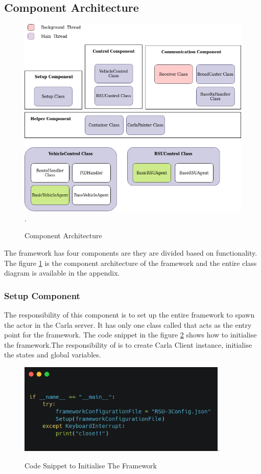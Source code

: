 \subsection{Component Architecture}

\begin{figure}[h!]
    \centering
    \includegraphics[width=12cm]{Framework/Images/FArc.png}.
    \caption{Component Architecture}
    \label{arrrk}
\end{figure}

The framework has four components are they are divided based on functionality. The figure \ref{arrrk} is the component architecture of the framework and the entire class diagram is available in the appendix.

\subsubsection{Setup Component}
The responsibility of this component is to set up the entire framework to spawn the actor in the Carla server. It has only one class called  that acts as the entry point for the framework. The code snippet in the figure \ref{init} shows how to initialise the framework.The responsibility of   is to create Carla Client instance, initialise the states and global variables. 

\begin{figure}[h!]
    \centering
    \includegraphics[width=10cm]{Framework/Images/init.png}.
    \caption{Code Snippet to Initialise The Framework}
    \label{init}
\end{figure}

